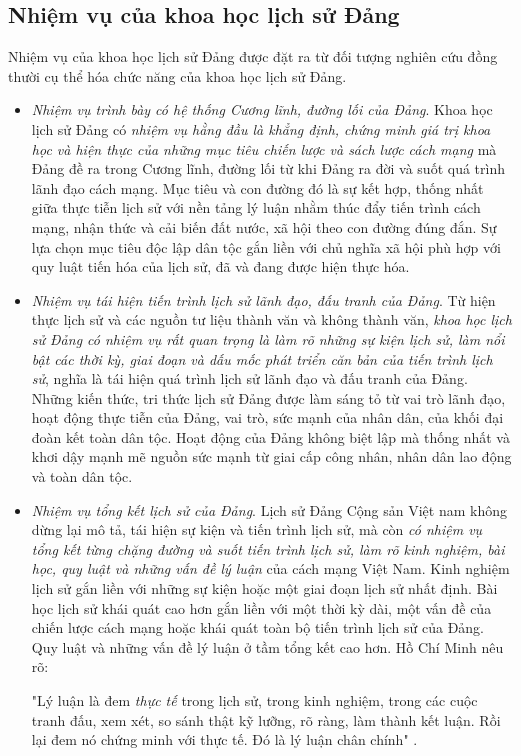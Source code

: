 \subsection{Nhiệm vụ của khoa học lịch sử Đảng}
Nhiệm vụ của khoa học lịch sử Đảng được đặt ra từ đối tượng nghiên cứu đồng thười cụ thể hóa chức năng của khoa học lịch sử Đảng.
\begin{itemize}
\item \textit{Nhiệm vụ trình bày có hệ thống Cương lĩnh, đường lối của Đảng}. Khoa học lịch sử Đảng có \textit{nhiệm vụ hằng đầu là khẳng định, chứng minh giá trị khoa học và hiện thực của những mục tiêu chiến lược và sách lược cách mạng} mà Đảng đề ra trong Cương lĩnh, đường lối từ khi Đảng ra đời và suốt quá trình lãnh đạo cách mạng. Mục tiêu và con đường đó là sự kết hợp, thống nhất giữa thực tiễn lịch sử với nền tảng lý luận nhằm thúc đẩy tiến trình cách mạng, nhận thức và cải biến đất nước, xã hội theo con đường đúng đắn. Sự lựa chọn mục tiêu độc lập dân tộc gắn liền với chủ nghĩa xã hội phù hợp với quy luật tiến hóa của lịch sử, đã và đang được hiện thực hóa.
\item \textit{Nhiệm vụ tái hiện tiến trình lịch sử lãnh đạo, đấu tranh của Đảng}. Từ hiện thực lịch sử và các nguồn tư liệu thành văn và không thành văn, \textit{khoa học lịch sử Đảng có nhiệm vụ rất quan trọng là làm rõ những sự kiện lịch sử, làm nổi bật các thời kỳ, giai đoạn và dấu mốc phát triển căn bản của tiến trình lịch sử}, nghĩa là tái hiện quá trình lịch sử lãnh đạo và đấu tranh của Đảng. Những kiến thức, tri thức lịch sử Đảng được làm sáng tỏ từ vai trò lãnh đạo, hoạt động thực tiễn của Đảng, vai trò, sức mạnh của nhân dân, của khối đại đoàn kết toàn dân tộc. Hoạt động của Đảng không biệt lập mà thống nhất và khơi dậy mạnh mẽ nguồn sức mạnh từ giai cấp công nhân, nhân dân lao động và toàn dân tộc.
\item \textit{Nhiệm vụ tổng kết lịch sử của Đảng}. Lịch sử Đảng Cộng sản Việt nam không dừng lại mô tả, tái hiện sự kiện và tiến trình lịch sử, mà còn \textit{có nhiệm vụ tổng kết từng chặng đường và suốt tiến trình lịch sử, làm rõ kinh nghiệm, bài học, quy luật và những vấn đề lý luận} của cách mạng Việt Nam. Kinh nghiệm lịch sử gắn liền với những sự kiện hoặc một giai đoạn lịch sử nhất định. Bài học lịch sử khái quát cao hơn gắn liền với một thời kỳ dài, một vấn đề của chiến lược cách mạng hoặc khái quát toàn bộ tiến trình lịch sử của Đảng. Quy luật và những vấn đề lý luận ở tầm tổng kết cao hơn. Hồ Chí Minh nêu rõ:

"Lý luận là đem \textit{thực tế} trong lịch sử, trong kinh nghiệm, trong các cuộc tranh đấu, xem xét, so sánh thật kỹ lưỡng, rõ ràng, làm thành kết luận. Rồi lại đem nó chứng minh với thực tế. Đó là lý luận chân chính" .


\end{itemize}
